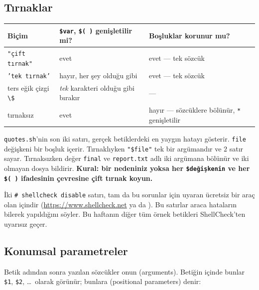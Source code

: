 \subsection{Tırnaklar}
\label{sec:quoting}




\begin{center}
\small
\begin{tabular}{@{}lll@{}}
\toprule
\textbf{Biçim} & \textbf{\texttt{\$var}, \texttt{\$( )} genişletilir mi?} & \textbf{Boşluklar korunur mu?}\\
\midrule
\texttt{"çift tırnak"} & evet & evet --- tek sözcük\\
\texttt{'tek tırnak'} & hayır, her şey olduğu gibi & evet --- tek sözcük\\
ters eğik çizgi \texttt{\textbackslash\$} & \emph{tek} karakteri olduğu gibi bırakır & ---\\
tırnaksız & evet & hayır --- sözcüklere bölünür, \texttt{*} genişletilir\\
\bottomrule
\end{tabular}
\end{center}

\texttt{quotes.sh}'nin son iki satırı, gerçek betiklerdeki en yaygın hatayı gösterir. \texttt{file} değişkeni bir boşluk içerir. Tırnaklıyken \texttt{"\$file"} tek bir argümandır ve  $2$ satır sayar. Tırnaksızken değer \texttt{final} ve \texttt{report.txt} adlı iki argümana bölünür ve  iki olmayan dosya bildirir. \textbf{Kural: bir nedeniniz yoksa her \texttt{\$değişkenin} ve her \texttt{\$( )} ifadesinin çevresine çift tırnak koyun.}

İki \texttt{\# shellcheck disable} satırı, tam da bu sorunlar için uyaran ücretsiz bir araç olan  içindir (\url{https://www.shellcheck.net} ya da ). Bu satırlar araca hataların bilerek yapıldığını söyler. Bu haftanın diğer tüm örnek betikleri ShellCheck'ten uyarısız geçer.

\subsection{Konumsal parametreler}

Betik adından sonra yazılan sözcükler onun  (arguments). Betiğin içinde bunlar \texttt{\$1}, \texttt{\$2}, \ldots\ olarak görünür; bunlara  (positional parameters) denir:

